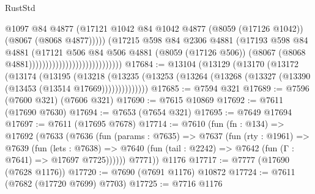 \begin{lexlean}{RustStd}
\begin{coremodule}
                                                      @1097
                                                      @84
                                                      @4877
                                                      (@17121
                                                        @1042
                                                        @84
                                                        @1042
                                                        @4877
                                                        (@8059 (@17126 @1042))
                                                        (@8067 (@8068 @4877)))))
                                                  (@17215
                                                    @598
                                                    @84
                                                    @2306
                                                    @4881
                                                    (@17193
                                                      @598
                                                      @84
                                                      @4881
                                                      (@17121
                                                        @506
                                                        @84
                                                        @506
                                                        @4881
                                                        (@8059 (@17126 @506))
                                                        (@8067
                                                          (@8068 @4881))))))))))))))))))))))))))))
@17684 := @13104
    (@13129
      (@13170
        (@13172
          (@13174
            (@13195
              (@13218
                (@13235 (@13253 (@13264 (@13268 (@13327 (@13390 (@13453 (@13514 @17669))))))))))))))
@17685 := @7594 @321
@17689 := @7596 (@7600 @321) (@7606 @321)
@17690 := @7615 @10869
@17692 := @7611 (@17690 @7630)
@17694 := @7653 (@7654 @321)
@17695 := @7649 @17694
@17697 := @7611 (@17695 @7678)
@17714 := @7610
    (fun (fn : @134) =>
    @17692
      (@7633
        (@7636
          (fun (params : @7635) =>
          @7637
            (fun (rty : @1961) =>
            @7639
              (fun (lets : @7638) =>
              @7640 (fun (tail : @2242) => @7642 (fun (Γ : @7641) => @17697 @7725))))))
        @7771))
    @1176
@17717 := @7777 (@17690 (@7628 @1176))
@17720 := @7690 (@7691 @1176) @10872
@17724 := @7611 (@7682 (@17720 @7699) @7703)
@17725 := @7716 @1176

\end{coremodule}
\end{lexlean}
